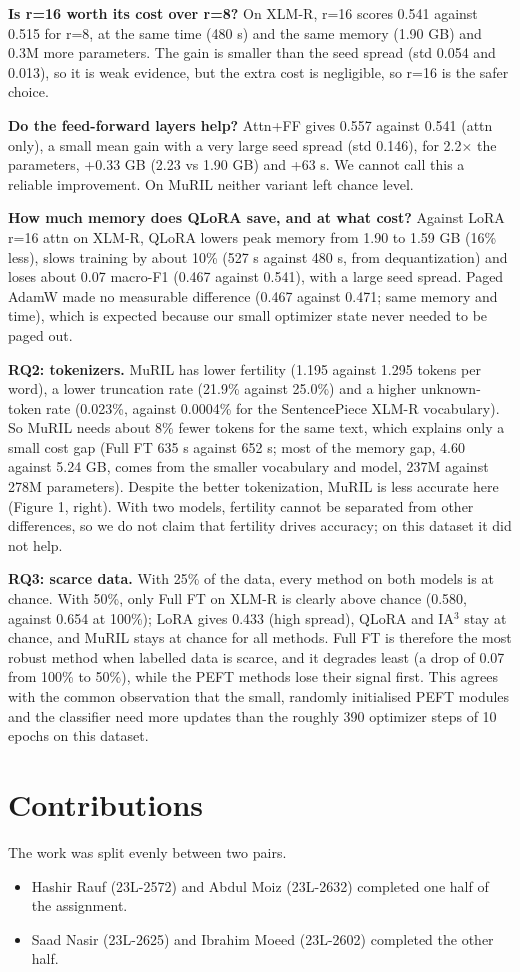 \documentclass[10pt,a4paper]{article}
\begin{document}
\textbf{Is r=16 worth its cost over r=8?} On XLM-R, r=16 scores 0.541 against 0.515 for r=8, at the same time (480 s) and the same memory (1.90 GB) and 0.3M more parameters. The gain is smaller than the seed spread (std 0.054 and 0.013), so it is weak evidence, but the extra cost is negligible, so r=16 is the safer choice.

\textbf{Do the feed-forward layers help?} Attn+FF gives 0.557 against 0.541 (attn only), a small mean gain with a very large seed spread (std 0.146), for 2.2$\times$ the parameters, +0.33 GB (2.23 vs 1.90 GB) and +63 s. We cannot call this a reliable improvement. On MuRIL neither variant left chance level.

\textbf{How much memory does QLoRA save, and at what cost?} Against LoRA r=16 attn on XLM-R, QLoRA lowers peak memory from 1.90 to 1.59 GB (16\% less), slows training by about 10\% (527 s against 480 s, from dequantization) and loses about 0.07 macro-F1 (0.467 against 0.541), with a large seed spread. Paged AdamW made no measurable difference (0.467 against 0.471; same memory and time), which is expected because our small optimizer state never needed to be paged out.

\textbf{RQ2: tokenizers.} MuRIL has lower fertility (1.195 against 1.295 tokens per word), a lower truncation rate (21.9\% against 25.0\%) and a higher unknown-token rate (0.023\%, against 0.0004\% for the SentencePiece XLM-R vocabulary). So MuRIL needs about 8\% fewer tokens for the same text, which explains only a small cost gap (Full FT 635 s against 652 s; most of the memory gap, 4.60 against 5.24 GB, comes from the smaller vocabulary and model, 237M against 278M parameters). Despite the better tokenization, MuRIL is less accurate here (Figure 1, right). With two models, fertility cannot be separated from other differences, so we do not claim that fertility drives accuracy; on this dataset it did not help.

\textbf{RQ3: scarce data.} With 25\% of the data, every method on both models is at chance. With 50\%, only Full FT on XLM-R is clearly above chance (0.580, against 0.654 at 100\%); LoRA gives 0.433 (high spread), QLoRA and IA$^3$ stay at chance, and MuRIL stays at chance for all methods. Full FT is therefore the most robust method when labelled data is scarce, and it degrades least (a drop of 0.07 from 100\% to 50\%), while the PEFT methods lose their signal first. This agrees with the common observation that the small, randomly initialised PEFT modules and the classifier need more updates than the roughly 390 optimizer steps of 10 epochs on this dataset.

\section{Contributions}
The work was split evenly between two pairs.
\begin{itemize}
\item Hashir Rauf (23L-2572) and Abdul Moiz (23L-2632) completed one half of the assignment.
\item Saad Nasir (23L-2625) and Ibrahim Moeed (23L-2602) completed the other half.
\end{itemize}
\end{document}
